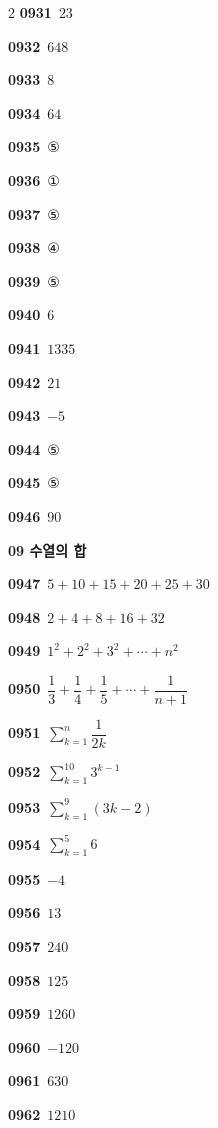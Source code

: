 \documentclass[10pt,a4paper]{article}
\begin{document}
\begin{multicols}{2}
\noindent\textbf{0931}\ $23$\par
\noindent\textbf{0932}\ $648$\par
\noindent\textbf{0933}\ $8$\par
\noindent\textbf{0934}\ $64$\par
\noindent\textbf{0935}\ ⑤\par
\noindent\textbf{0936}\ ①\par
\noindent\textbf{0937}\ ⑤\par
\noindent\textbf{0938}\ ④\par
\noindent\textbf{0939}\ ⑤\par
\noindent\textbf{0940}\ $6$\par
\noindent\textbf{0941}\ $1335$\par
\noindent\textbf{0942}\ $21$\par
\noindent\textbf{0943}\ $-5$\par
\noindent\textbf{0944}\ ⑤\par
\noindent\textbf{0945}\ ⑤\par
\noindent\textbf{0946}\ $90$\par
\noindent\textbf{09 수열의 합}\par\smallskip
\noindent\textbf{0947}\ $5+10+15+20+25+30$\par
\noindent\textbf{0948}\ $2+4+8+16+32$\par
\noindent\textbf{0949}\ $1^2+2^2+3^2+\cdots+n^2$\par
\noindent\textbf{0950}\ $\dfrac{1}{3}+\dfrac{1}{4}+\dfrac{1}{5}+\cdots+\dfrac{1}{n+1}$\par
\noindent\textbf{0951}\ $\displaystyle\sum_{k=1}^{n} \dfrac{1}{2k}$\par
\noindent\textbf{0952}\ $\displaystyle\sum_{k=1}^{10} 3^{k-1}$\par
\noindent\textbf{0953}\ $\displaystyle\sum_{k=1}^{9} (3k-2)$\par
\noindent\textbf{0954}\ $\displaystyle\sum_{k=1}^{5} 6$\par
\noindent\textbf{0955}\ $-4$\par
\noindent\textbf{0956}\ $13$\par
\noindent\textbf{0957}\ $240$\par
\noindent\textbf{0958}\ $125$\par
\noindent\textbf{0959}\ $1260$\par
\noindent\textbf{0960}\ $-120$\par
\noindent\textbf{0961}\ $630$\par
\noindent\textbf{0962}\ $1210$\par

\end{multicols}
\end{document}
